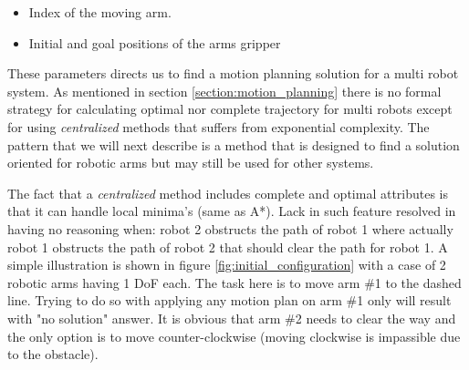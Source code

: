 \documentclass[english]{article}
\theoremstyle{definition}
\begin{document}
\begin{itemize}
	\item Index of the moving arm.
	\item Initial and goal positions of the arms gripper
\end{itemize}

These parameters directs us to find a motion planning solution for a multi robot system. As mentioned in section \ref{section:motion_planning} there is no formal strategy for calculating optimal nor complete trajectory for multi robots except for using \textit{centralized} methods that suffers from exponential complexity. The pattern that we will next describe is a method that is designed to find a solution oriented for robotic arms but may still be used for other systems. 

The fact that a \textit{centralized} method includes complete and optimal attributes is that it can handle local minima's (same as A*). Lack in such feature resolved in having no reasoning when: robot 2 obstructs the path of robot 1 where actually robot 1 obstructs the path of robot 2 that should clear the path for robot 1. A simple illustration is shown in figure \ref{fig:initial_configuration} with a case of 2 robotic arms having 1 DoF each. The task here is to move arm \#1 to the dashed line. Trying to do so with applying any motion plan on arm \#1 only will result with "no solution" answer. It is obvious that arm \#2 needs to clear the way and the only option is to move counter-clockwise (moving clockwise is impassible due to the obstacle). 
\end{document}
